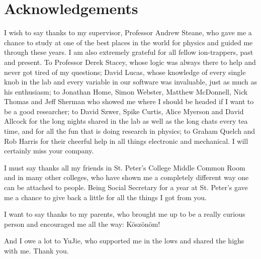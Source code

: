 \chapter*{Acknowledgements}

I wish to say thanks to my supervisor, Professor Andrew Steane, who gave me a chance to study at one of the best places in the world for physics and guided me through these years. I am also extremely grateful for all fellow ion-trappers, past and present. To Professor Derek Stacey, whose logic was always there to help and never got tired of my questions; David Lucas, whose knowledge of every single knob in the lab and every variable in our software was invaluable, just as much as his enthusiasm; to Jonathan Home, Simon Webster, Matthew McDonnell, Nick Thomas and Jeff Sherman who showed me where I should be headed if I want to be a good researcher; to David Szwer, Spike Curtis, Alice Myerson and David Allcock for the long nights shared in the lab as well as the long chats every tea time, and for all the fun that is doing research in physics; to Graham Quelch and Rob Harris for their cheerful help in all things electronic and mechanical. I will certainly miss your company.

I must say thanks all my friends in St. Peter's College Middle Common Room and in many other colleges, who have shown me a completely different way one can be attached to people. Being Social Secretary for a year at St. Peter's gave me a chance to give back a little for all the things I got from you.

I want to say thanks to my parents, who brought me up to be a really curious person and encouraged me all the way: K\"osz\"on\"om!

And I owe a lot to YuJie, who supported me in the lows and shared the highs with me. Thank you.
